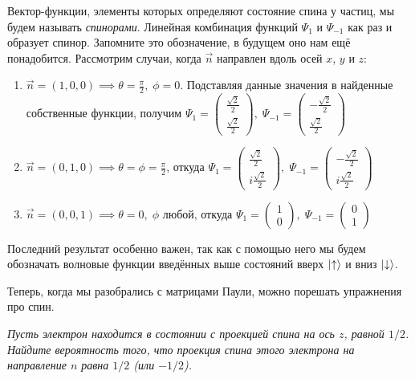 Вектор-функции, элементы которых определяют состояние спина у частиц, мы будем называть \textit{спинорами}. Линейная комбинация функций $\Psi_1$ и $\Psi_{-1}$ как раз и образует спинор. Запомните это обозначение, в будущем оно нам ещё понадобится.
Рассмотрим случаи, когда $\Vec{n}$ направлен вдоль осей $x$, $y$ и $z$:
\begin{enumerate}
    \item $\Vec{n} = (1, 0, 0) \implies \theta = \frac{\pi}{2}, \; \phi = 0.$ Подставляя данные значения в найденные собственные функции, получим $\Psi_1 = \begin{pmatrix}\frac{\sqrt{2}}{2} \\ \frac{\sqrt{2}}{2}\end{pmatrix}, \; \Psi_{-1} = \begin{pmatrix} -\frac{\sqrt{2}}{2} \\ \frac{\sqrt{2}}{2}\end{pmatrix}$
    \item $\Vec{n} = (0, 1, 0) \implies \theta = \phi = \frac{\pi}{2}$, откуда $\Psi_1 = \begin{pmatrix} \frac{\sqrt{2}}{2} \\ i\frac{\sqrt{2}}{2} \end{pmatrix}, \; \Psi_{-1} = \begin{pmatrix} -\frac{\sqrt{2}}{2} \\ i\frac{\sqrt{2}}{2} \end{pmatrix}$
    \item $\Vec{n} = (0, 0, 1) \implies \theta = 0, \; \phi$ любой, откуда $\Psi_1 = \begin{pmatrix} 1 \\ 0 \end{pmatrix}, \;
    \Psi_{-1} = \begin{pmatrix} 0 \\ 1 \end{pmatrix}$ 
\end{enumerate}
Последний результат особенно важен, так как с помощью него мы будем обозначать волновые функции введённых выше состояний вверх $\ket{\uparrow}$ и вниз $\ket{\downarrow}$.

Теперь, когда мы разобрались с матрицами Паули, можно порешать упражнения про спин.
\begin{center}
    \textit{Пусть электрон находится в состоянии с проекцией спина на ось $z$, равной $1/2$. Найдите вероятность того, что проекция спина этого электрона на направление $n$ равна $1/2$ (или $-1/2$).}
\end{center}

